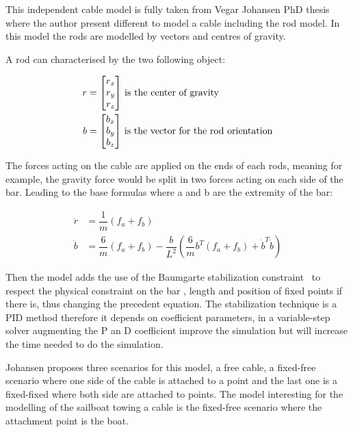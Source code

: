 This independent cable model is fully taken from  Vegar Johansen PhD thesis~\cite{johansen2007modelling} where the author present different to model a cable including the rod model. In this model the rods are modelled by vectors and centres of gravity.

A rod can characterised by the two following object:

\begin{align}
r &= \begin{bmatrix}
    r_x \\
    r_y \\
    r_z
\end{bmatrix}\, \textnormal{is the center of gravity}\\
b &= \begin{bmatrix}
    b_x \\
    b_y \\
    b_z
\end{bmatrix}\, \textnormal{is the vector for the rod orientation}
\end{align}

The forces acting on the cable are applied on the ends of each rods, meaning for example, the gravity force would be split in two forces acting on each side of the bar. Leading to the base formulas where a and b are the extremity of the bar:

\begin{align}
\ddot{r} &= \dfrac{1}{m}  (f_a+f_b) \\
\ddot{b} &=  \dfrac{6}{m}(f_a+f_b) - \dfrac{b}{L^{2}}  (\dfrac{6}{m}b^{T}(f_a+f_b)+\dot{b}^{T}\dot{b}) 
\end{align}

Then the model adds the use of the Baumgarte stabilization constraint~\cite{baumgarte1972stabilization} to respect the physical constraint on the bar , length and position of fixed points if there is, thus changing the precedent equation. 
The stabilization technique is a PID method therefore it depends on coefficient parameters, in a variable-step solver augmenting the P an D coefficient improve the simulation but will increase the time needed to do the simulation.

Johansen proposes three scenarios for this model, a free cable, a fixed-free scenario where one side of the cable is attached to a point and the last one is a fixed-fixed where both side are attached to points.
The model interesting for the modelling of the sailboat towing a cable is the fixed-free scenario where the attachment point is the boat.

